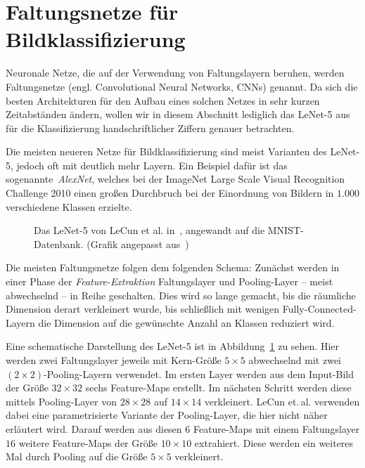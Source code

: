 \documentclass[paper=a4, 	%
		fontsize=11pt,
		abstract=true, 	%
		headsepline, 	%
		notitlepage	%
		]{scrartcl}
\theoremstyle{definition}
\begin{document}
\section{Faltungsnetze für Bildklassifizierung}

Neuronale Netze, die auf der Verwendung von Faltungslayern beruhen, werden Faltungsnetze (engl. \foreignlanguage{english}{Convolutional Neural Networks, CNNs}) genannt.
Da sich die besten Architekturen für den Aufbau eines solchen Netzes in sehr kurzen Zeitabständen ändern, wollen wir in diesem Abschnitt lediglich das LeNet-5 aus~\cite{lecun1998} für die Klassifizierung handschriftlicher Ziffern genauer betrachten.

Die meisten neueren Netze für Bildklassifizierung sind meist Varianten des LeNet-5, jedoch oft mit deutlich mehr Layern.
Ein Beispiel dafür ist das sogenannte~\emph{AlexNet}, welches bei der ImageNet Large Scale Visual Recognition Challenge 2010 \cite{ILSVRC15} einen großen Durchbruch bei der Einordnung von Bildern in $1{.}000$ verschiedene Klassen erzielte.

\begin{figure}
    \noindent\makebox[\textwidth]{
        \newcommand{\svgwidth}{1.2\textwidth}
        \scriptsize
        
    }
    \caption{Das LeNet-5 von LeCun et al. in~\cite{lecun1998}, angewandt auf die MNIST-Datenbank.
    {\scriptsize(Grafik angepasst aus~\cite{lecun1998})}}
    \label{fig:lenet-5}
\end{figure}

Die meisten Faltungsnetze folgen dem folgenden Schema:
Zunächst werden in einer Phase der \emph{Feature-Extraktion} Faltungslayer und Pooling-Layer -- meist abwechselnd -- in Reihe geschalten.
Dies wird so lange gemacht, bis die räumliche Dimension derart verkleinert wurde, bis schließlich mit wenigen Fully-Connected-Layern die Dimension auf die gewünschte Anzahl an Klassen reduziert wird.

Eine schematische Darstellung des LeNet-5 ist in Abbildung~\ref{fig:lenet-5} zu sehen.
Hier werden zwei Faltungslayer jeweils mit Kern-Größe $5\times 5$ abwechselnd mit zwei $(2\times 2)$-Pooling-Layern verwendet.
Im ersten Layer werden aus dem Input-Bild der Größe $32\times 32$ sechs Feature-Maps erstellt.
Im nächsten Schritt werden diese mittels Pooling-Layer von $28\times 28$ auf $14\times 14$ verkleinert.
LeCun et.\,al. verwenden dabei eine parametrisierte Variante der Pooling-Layer, die hier nicht näher erläutert wird.
Darauf werden aus diesen $6$ Feature-Maps mit einem Faltungslayer $16$ weitere Feature-Maps der Größe $10\times 10$ extrahiert.
Diese werden ein weiteres Mal durch Pooling auf die Größe $5\times 5$ verkleinert.
\end{document}
